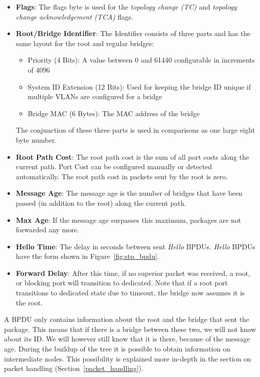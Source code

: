 \begin{itemize}
    \item \textbf{Flags}: The flags byte is used for the \textit{topology change (TC)} and \textit{topology change acknowledgement (TCA)} flags.
    \item \textbf{Root/Bridge Identifier}: The Identifier consists of three parts and has the same layout for the root and regular bridges:
        \begin{itemize}
            \item Priority (4 Bits): A value between 0 and 61440 configurable in increments of 4096
            \item System ID Extension (12 Bits): Used for keeping the bridge ID unique if multiple VLANs are configured for a bridge
            \item Bridge MAC (6 Bytes): The MAC address of the bridge
        \end{itemize}
        The conjunction of these three parts is used in comparisons as one large eight byte number.
        \item \textbf{Root Path Cost}: The root path cost is the sum of all port costs along the current path.
            Port Cost can be configured manually or detected automatically.
            The root path cost in packets sent by the root is zero.
    \item \textbf{Message Age}: The message age is the number of bridges that have been passed (in addition to the root) along the current path.
    \item \textbf{Max Age}: If the message age surpasses this maximum, packages are not forwarded any more.
    \item \textbf{Hello Time}: The delay in seconds between sent \textit{Hello} BPDUs.
        \textit{Hello} BPDUs have the form shown in Figure~\ref{fig:stp_bpdu}.
    \item \textbf{Forward Delay}: After this time, if no superior packet was received, a root, or blocking port will transition to dedicated.
        Note that if a root port transitions to dedicated state due to timeout, the bridge now assumes it is the root.
\end{itemize}
A BPDU only contains information about the root and the bridge that sent the package.
This means that if there is a bridge between these two, we will not know about its ID.
We will however still know that it is there, because of the message age.
During the buildup of the tree it is possible to obtain information on intermediate nodes.
This possibility is explained more in-depth in the section on packet handling (Section~\ref{packet_handling}).

